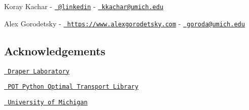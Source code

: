 \begin{DoxyItemize}
\item Koray Kachar -\/ \href{https://www.linkedin.com/in/koray-kachar/}{\texttt{ @linkedin}} -\/ \href{mailto:kkachar@umich.edu}{\texttt{ kkachar@umich.\+edu}}
\item Alex Gorodetsky -\/ \href{https://www.alexgorodetsky.com}{\texttt{ https\+://www.\+alexgorodetsky.\+com}} -\/ \href{mailto:goroda@umich.edu}{\texttt{ goroda@umich.\+edu}}
\end{DoxyItemize}

\subsection*{Acknowledgements}


\begin{DoxyItemize}
\item \href{https://www.draper.com}{\texttt{ Draper Laboratory}}
\item \href{https://github.com/rflamary/POT}{\texttt{ P\+OT Python Optimal Transport Library}}
\item \href{https://aero.engin.umich.edu}{\texttt{ University of Michigan}} 
\end{DoxyItemize}